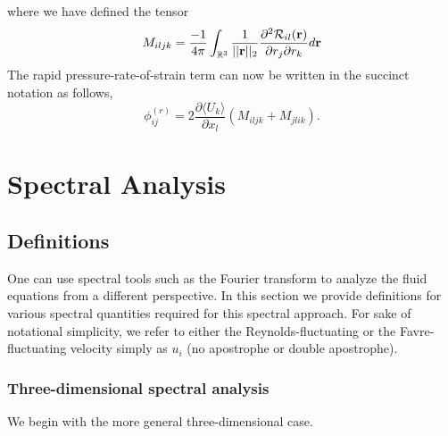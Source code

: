 \documentclass[oneside,a4paper,11pt]{report}
\newcommand{\tpvc}{\mathcal{R}} %
\newcommand{\redi}{\phi}        %
\newcommand{\ukavg}{\langle U_k \rangle}
\begin{document}
where we have defined the tensor 
\begin{equation}
M_{iljk} = \frac{-1}{4\pi}\int_\Rthree \frac{1}{||\rvec||_2} \frac{\partial^2 \tpvc_{il}(\rvec)}{\partial r_j \partial r_k} d\rvec 
\end{equation}
The rapid pressure-rate-of-strain term can now be written in the succinct notation as follows,
\begin{equation}
\redi^{(r)}_{ij} = 2\frac{\partial \ukavg}{\partial x_l} (M_{iljk} + M_{jlik}).
\end{equation}

%
\chapter{Spectral Analysis}
%

\section{Definitions}
One can use spectral tools such as the Fourier transform to analyze the fluid equations from a different perspective. In this section we provide definitions for various spectral quantities required for this spectral approach. For sake of notational simplicity, we refer to either the Reynolds-fluctuating or the Favre-fluctuating velocity simply as $u_i$ (no apostrophe or double apostrophe).

\subsection{Three-dimensional spectral analysis}
We begin with the more general three-dimensional case.
\end{document}

